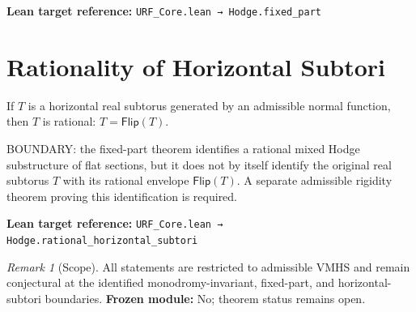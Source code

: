\documentclass[11pt]{article}
\theoremstyle{plain}
\theoremstyle{remark}
\newtheorem{remark}[theorem]{Remark}
\begin{document}
\noindent
\textbf{Lean target reference:}
\texttt{URF\_Core.lean → Hodge.fixed\_part}

\section{Rationality of Horizontal Subtori}

\begin{conjecture}\label{cor:hodge-rational}
If $T$ is a horizontal real subtorus generated by an admissible normal function, then $T$ is rational: $T = \mathsf{Flip}(T)$.
\end{conjecture}

\noindent
BOUNDARY: the fixed-part theorem identifies a rational mixed Hodge substructure
of flat sections, but it does not by itself identify the original real subtorus
$T$ with its rational envelope $\mathsf{Flip}(T)$.  A separate admissible
rigidity theorem proving this identification is required.

\noindent
\textbf{Lean target reference:}
\texttt{URF\_Core.lean → Hodge.rational\_horizontal\_subtori}

\begin{remark}[Scope]
All statements are restricted to admissible VMHS and remain conjectural at the
identified monodromy-invariant, fixed-part, and horizontal-subtori boundaries.
\textbf{Frozen module:} No; theorem status remains open.
\end{remark}
\end{document}
